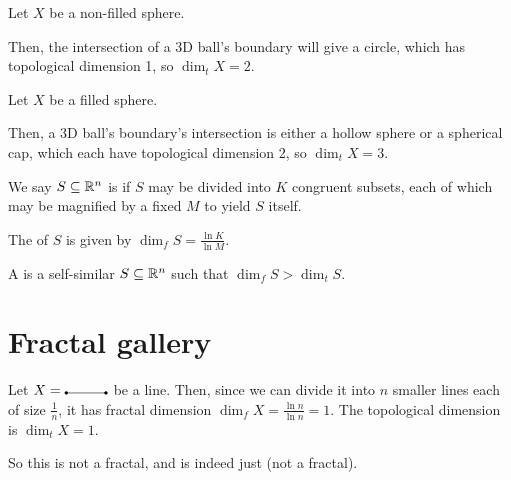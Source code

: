 \documentclass[class=pmath370,tikz,notes]{agony}
\begin{document}
\begin{example}
  Let $X$ be a non-filled sphere.
  \begin{center}
  \end{center}
  Then, the intersection of a 3D ball's boundary
  will give a circle, which has topological dimension 1,
  so $\dim_t X = 2$.
\end{example}

\begin{example}
  Let $X$ be a filled sphere.

  Then, a 3D ball's boundary's intersection is either a hollow sphere
  or a spherical cap, which each have topological dimension 2,
  so $\dim_t X = 3$.
\end{example}

\begin{defn}
  We say $S \subseteq \mathbb{R}^n$ is  if $S$ may be divided into
  $K$ congruent subsets, each of which may be magnified by a fixed $M$
  to yield $S$ itself.

  The  of $S$ is given by $\dim_f S = \frac{\ln K}{\ln M}$.
\end{defn}

\begin{defn}[fractal]
  A  is a self-similar $S \subseteq \mathbb{R}^n$
  such that $\dim_f S > \dim_t S$.
\end{defn}

\section{Fractal gallery}

\begin{example}
  Let $X = \tikz{
      \draw[fill=black] (0,0) circle (1 pt);
      \draw (0,0) -- (1,0);
      \draw[fill=black] (1,0) circle (1 pt);
    }$ be a line.
  Then, since we can divide it into $n$ smaller lines each of size $\frac1n$,
  it has fractal dimension $\dim_f X = \frac{\ln n}{\ln n} = 1$.
  The topological dimension is $\dim_t X = 1$.

  So this is not a fractal, and is indeed just  (not a fractal).
\end{example}
\end{document}

